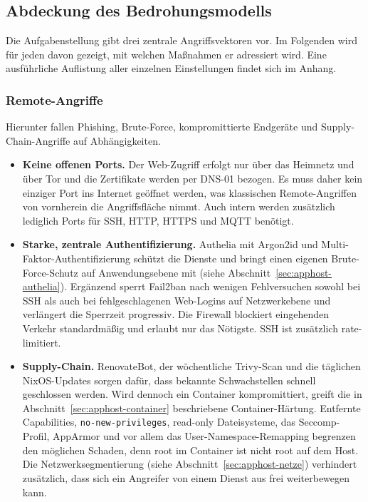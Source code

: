\subsection{Abdeckung des Bedrohungsmodells} \label{sec:gefahrenmodell}

Die Aufgabenstellung gibt drei zentrale Angriffsvektoren vor. Im Folgenden
wird für jeden davon gezeigt, mit welchen Maßnahmen er adressiert wird. Eine
ausführliche Auflistung aller einzelnen Einstellungen findet sich im Anhang.

\subsubsection{Remote-Angriffe}

Hierunter fallen Phishing, Brute-Force, kompromittierte Endgeräte und
Supply-Chain-Angriffe auf Abhängigkeiten.

\begin{itemize}
  \item \textbf{Keine offenen Ports.} Der Web-Zugriff erfolgt nur über das
    Heimnetz und über Tor und die Zertifikate werden per \ac{DNS}-01 bezogen.
    Es muss daher kein einziger Port ins Internet geöffnet werden, was
    klassischen Remote-Angriffen von vornherein die Angriffsfläche nimmt.
    Auch intern werden zusätzlich lediglich Ports für \ac{SSH}, \ac{HTTP}, \ac{HTTPS} und \ac{MQTT} benötigt.
  \item \textbf{Starke, zentrale Authentifizierung.} Authelia mit Argon2id
    und Multi-Faktor-Authentifizierung schützt die Dienste und bringt einen
    eigenen Brute-Force-Schutz auf Anwendungsebene mit (siehe
    Abschnitt~\ref{sec:apphost-authelia}). Ergänzend sperrt Fail2ban nach
    wenigen Fehlversuchen sowohl bei \ac{SSH} als auch bei fehlgeschlagenen
    Web-Logins auf Netzwerkebene und verlängert die Sperrzeit progressiv.
    Die Firewall blockiert eingehenden Verkehr standardmäßig und erlaubt nur
    das Nötigste. \ac{SSH} ist zusätzlich rate-limitiert.
  \item \textbf{Supply-Chain.} RenovateBot, der wöchentliche Trivy-Scan und
    die täglichen NixOS-Updates sorgen dafür, dass bekannte Schwachstellen
    schnell geschlossen werden. Wird dennoch ein Container kompromittiert,
    greift die in Abschnitt~\ref{sec:apphost-container} beschriebene
    Container-Härtung. Entfernte Capabilities, \texttt{no-new-privileges},
    read-only Dateisysteme, das Seccomp-Profil, AppArmor und vor allem das
    User-Namespace-Remapping begrenzen den möglichen Schaden, denn root im
    Container ist nicht root auf dem Host. Die Netzwerksegmentierung
    (siehe Abschnitt~\ref{sec:apphost-netze}) verhindert zusätzlich, dass sich ein
    Angreifer von einem Dienst aus frei weiterbewegen kann.
\end{itemize}

